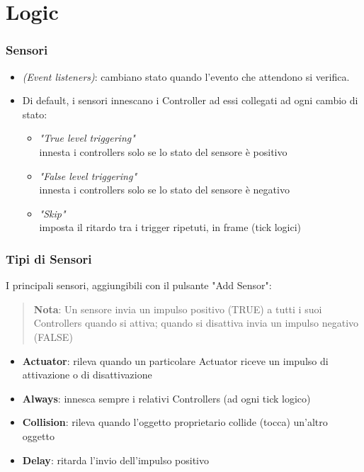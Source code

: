 \documentclass{beamer}
\begin{document}
	\section{Logic}
		\begin{frame}		%
			\frametitle{Sensori}
			\begin{itemize}
				\item \textit{(Event listeners)}: \textcolor{BlenderOrange}{cambiano stato} quando l'evento che attendono si verifica.
				\item Di default, i sensori \textcolor{BlenderOrange}{innescano i Controller} ad essi collegati ad ogni cambio di stato:
				\begin{itemize}
					\item \textit{"True level triggering"} \\ {\footnotesize\hspace{1em} innesta i controllers solo se lo stato del sensore è positivo}
					\item \textit{"False level triggering"} \\ {\footnotesize\hspace{1em}innesta i controllers solo se lo stato del sensore è negativo}
					\item \textit{"Skip"} \\ {\footnotesize\hspace{1em}imposta il ritardo tra i trigger ripetuti, in frame (tick logici)}
				\end{itemize}
			\end{itemize}
		\end{frame}		
		\begin{frame}
			\frametitle{Tipi di Sensori}
			I principali sensori, aggiungibili con il pulsante "Add Sensor":\\
			\begin{quote}
			\textcolor{BlenderOrange}{\textbf{Nota}: Un sensore invia un impulso positivo (TRUE) a tutti i suoi Controllers quando si attiva; quando si disattiva invia un impulso negativo (FALSE)}
			\end{quote}
						
			\begin{itemize}
				\item \textbf{Actuator}: rileva quando un particolare Actuator riceve un impulso di attivazione o di disattivazione
				\item \textbf{Always}: innesca sempre i relativi Controllers (ad ogni tick logico)
				\item \textbf{Collision}: rileva quando l'oggetto proprietario collide (tocca) un'altro oggetto
				\item \textbf{Delay}: ritarda l'invio dell'impulso positivo
			\end{itemize}
		\end{frame}	
\end{document}
